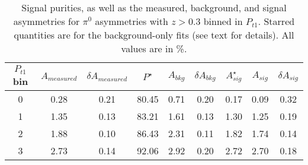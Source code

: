 \begin{table}[H]\footnotesize
\centering
\begin{tabular}{|c|c|c|c|c|c|c|c|c|}
 \hline
$P_{t1}$ bin & $A_{measured}$ & $\delta A_{measured}$ & $P^{\star}$  & $A_{bkg}$ & $\delta A_{bkg}$ & $A_{sig}^{\star}$ & $ A_{sig}$  & $\delta A_{sig}$ \\ \hline\hline
0 & 0.28 & 0.21 & 80.45 & 0.71 & 0.20 & 0.17 & 0.09 & 0.32 \\ \hline 
1 & 1.35 & 0.13 & 83.21 & 1.61 & 0.13 & 1.30 & 1.25 & 0.19 \\ \hline 
2 & 1.88 & 0.10 & 86.43 & 2.31 & 0.11 & 1.82 & 1.74 & 0.14 \\ \hline 
3 & 2.73 & 0.14 & 92.06 & 2.92 & 0.20 & 2.72 & 2.70 & 0.18 \\ \hline 
\end{tabular}
\caption[BG-correction quantities for $\pi^0$ asymmetries with $z>0.3$, $P_{t1}$ bins]{Signal purities, as well as the measured, background, and signal asymmetries for $\pi^0$ asymmetries with $z>0.3$ binned in $P_{t1}$. Starred quantities are for the background-only fits (see text for details). All values are in \%.}
\label{tab:pi0sinptbkgcor}
\end{table}

